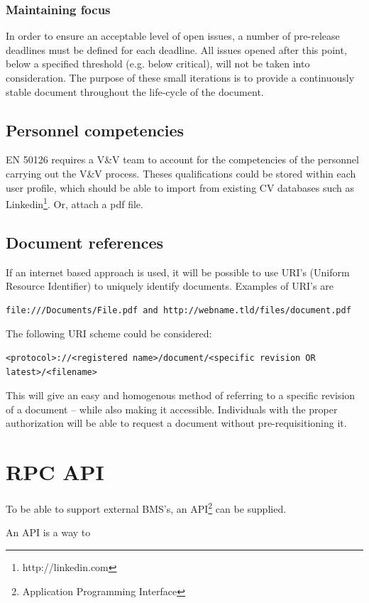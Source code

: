 \documentclass[10pt,a4paper]{article}
\begin{document}
\subsubsection{Maintaining focus}
In order to ensure an acceptable level of open issues, a number of pre-release deadlines must be defined for each deadline. All issues opened after this point, below a specified threshold (e.g. below critical), will not be taken into consideration. The purpose of these small iterations is to provide a continuously stable document throughout the life-cycle of the document.

\subsection{Personnel competencies}
EN 50126 requires a V\&V team to account for the competencies of the personnel carrying out the V\&V process. Theses qualifications could be stored within each user profile, which should be able to import from existing CV databases such as Linkedin\footnote{http://linkedin.com}. Or, attach a pdf file.

\subsection{Document references}
If an internet based approach is used, it will be possible to use URI's (Uniform Resource Identifier) to uniquely identify documents. Examples of URI's are 
\begin{verbatim}
file:///Documents/File.pdf and http://webname.tld/files/document.pdf
\end{verbatim}
The following URI scheme could be considered: 
\begin{verbatim}
<protocol>://<registered name>/document/<specific revision OR latest>/<filename>
\end{verbatim}

This will give an easy and homogenous method of referring to a specific revision of a document – while also making it accessible. Individuals with the proper authorization will be able to request a document without pre-requisitioning it.


\section{RPC API}
To be able to support external BMS's, an API\footnote{Application Programming Interface} can be supplied.

An API is a way to 
\end{document}
